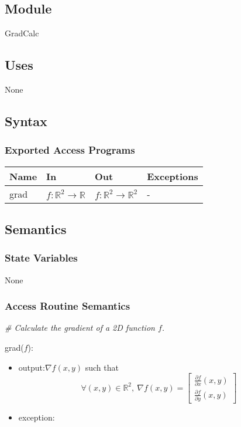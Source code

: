 \documentclass[12pt, titlepage]{article}
\begin{document}
\subsection{Module}
GradCalc
\subsection{Uses}
None
\subsection{Syntax}

\subsubsection{Exported Access Programs}
\begin{center}
\begin{tabular}{p{2cm} p{4cm} p{4cm} p{3cm}}
\hline
\textbf{Name} & \textbf{In} & \textbf{Out} & \textbf{Exceptions} \\
\hline
grad & $f:\mathbb{R}^2\rightarrow\mathbb{R}$  & 
$f:\mathbb{R}^2\rightarrow\mathbb{R}^2$ & -\\
\hline
\end{tabular}
\end{center}

\subsection{Semantics}

\subsubsection{State Variables}
None

\subsubsection{Access Routine Semantics}

\noindent\textit{{\#} Calculate the gradient of a 2D function $f$.} \medskip

\noindent grad($f$):
\begin{itemize} 
\item output:$ \nabla f(x,y)$ such that
\begin{equation*}
\forall (x,y) \in \mathbb{R}^2, \ \nabla f(x,y) = \begin{bmatrix}
\frac{\partial f}{\partial x}(x,y) \\
\frac{\partial f}{\partial y}(x,y)
\end{bmatrix}
\end{equation*}
\item exception: 
\end{itemize}
\end{document}
